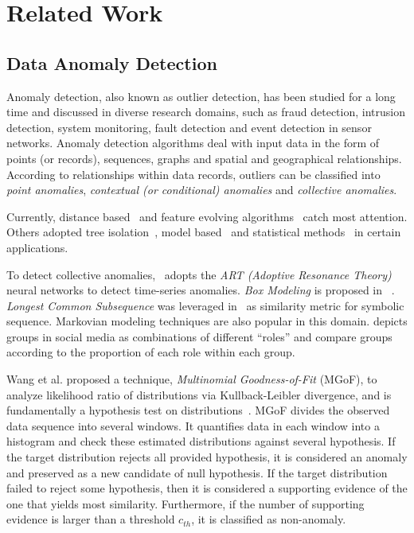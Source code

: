 \documentclass[10pt,conference,letterpaper]{article}
\begin{document}
	\section{Related Work}\label{sec:related-work}
		\subsection{Data Anomaly Detection}
			Anomaly detection, also known as outlier detection, has been studied for a long time and discussed in diverse research domains, such as fraud detection, intrusion detection, system monitoring, fault detection and event detection in sensor networks.
			Anomaly detection algorithms deal with input data in the form of points (or records), sequences, graphs and spatial and geographical relationships.~\cite{chandola2009anomaly} According to relationships within data records, outliers can be classified into \textit{point anomalies}, \textit{contextual (or conditional) anomalies} and \textit{collective anomalies}.~\cite{goldberger2000components}
			
			Currently, distance based~\cite{cao2014scalable,cao2017multi} and feature evolving algorithms~\cite{masud2013classification,li2015discovery,shao2014prototype} catch most attention. Others adopted tree isolation~\cite{zhang2017lshiforest}, model based~\cite{yin2016model} and statistical methods~\cite{zhu2002statstream} in certain applications.
	
			To detect collective anomalies,~\cite{caudell1993adaptive} adopts the \textit{ART (Adoptive Resonance Theory)} neural networks to detect time-series anomalies. \textit{Box Modeling} is proposed in ~\cite{chan2005modeling}. \textit{Longest Common Subsequence} was leveraged in~\cite{budalakoti2006anomaly} as similarity metric for symbolic sequence. Markovian modeling techniques are also popular in this domain\cite{ye2000markov,warrender1999detecting,pavlov2003sequence}. \cite{yu2015glad} depicts groups in social media as combinations of different ``roles'' and compare groups according to the proportion of each role within each group.
			
			Wang et al. proposed a technique, \textit{Multinomial Goodness-of-Fit} (MGoF), to analyze likelihood ratio of distributions via Kullback-Leibler divergence, and is fundamentally a hypothesis test on distributions~\cite{wang2011statistical}.
			MGoF divides the observed data sequence into several windows. It quantifies data in each window into a histogram and check these estimated distributions against several hypothesis. If the target distribution rejects all provided hypothesis, it is considered an anomaly and preserved as a new candidate of null hypothesis. If the target distribution failed to reject some hypothesis, then it is considered a supporting evidence of the one that yields most similarity. Furthermore, if the number of supporting evidence is larger than a threshold $c_{th}$, it is classified as non-anomaly.
			
\end{document}
